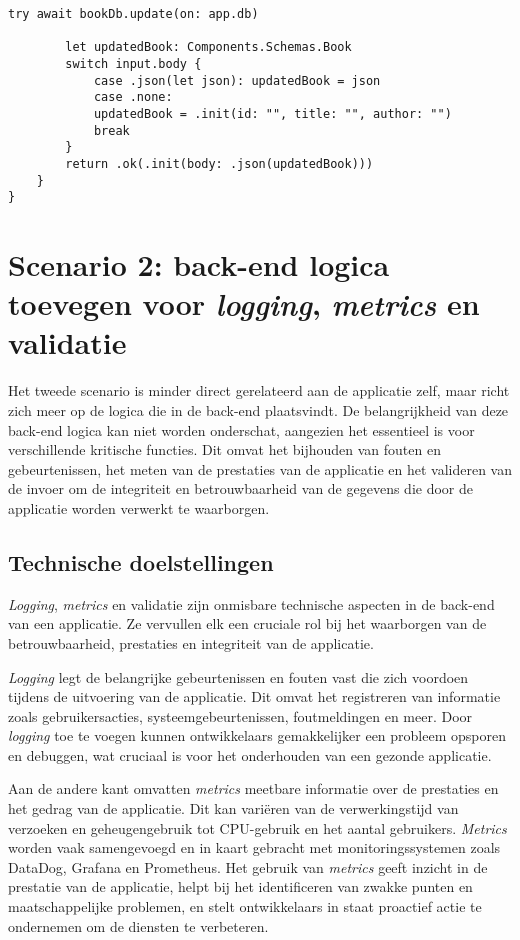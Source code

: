 \begin{lstlisting}[caption=handler file]
        try await bookDb.update(on: app.db)
        
        let updatedBook: Components.Schemas.Book
        switch input.body {
            case .json(let json): updatedBook = json
            case .none:
            updatedBook = .init(id: "", title: "", author: "")
            break
        }
        return .ok(.init(body: .json(updatedBook)))
    }
}

\end{lstlisting}

\section{Scenario 2: back-end logica toevegen voor \textit{logging}, \textit{metrics} en validatie}

Het tweede scenario is minder direct gerelateerd aan de applicatie zelf, maar richt zich meer op de logica die in de back-end plaatsvindt. De belangrijkheid van deze back-end logica kan niet worden onderschat, aangezien het essentieel is voor verschillende kritische functies. Dit omvat het bijhouden van fouten en gebeurtenissen, het meten van de prestaties van de applicatie en het valideren van de invoer om de integriteit en betrouwbaarheid van de gegevens die door de applicatie worden verwerkt te waarborgen.

\subsection{Technische doelstellingen}

\textit{Logging}, \textit{metrics} en validatie zijn onmisbare technische aspecten in de back-end van een applicatie. Ze vervullen elk een cruciale rol bij het waarborgen van de betrouwbaarheid, prestaties en integriteit van de applicatie.

\textit{Logging} legt de belangrijke gebeurtenissen en fouten vast die zich voordoen tijdens de uitvoering van de applicatie. Dit omvat het registreren van informatie zoals gebruikersacties, systeemgebeurtenissen, foutmeldingen en meer. Door \textit{logging} toe te voegen kunnen ontwikkelaars gemakkelijker een probleem opsporen en debuggen, wat cruciaal is voor het onderhouden van een gezonde applicatie. 

Aan de andere kant omvatten \textit{metrics} meetbare informatie over de prestaties en het gedrag van de applicatie. Dit kan variëren van de verwerkingstijd van verzoeken en geheugengebruik tot CPU-gebruik en het aantal gebruikers. \textit{Metrics} worden vaak samengevoegd en in kaart gebracht met monitoringssystemen zoals DataDog, Grafana en Prometheus. Het gebruik van \textit{metrics} geeft inzicht in de prestatie van de applicatie, helpt bij het identificeren van zwakke punten en maatschappelijke problemen, en stelt ontwikkelaars in staat proactief actie te ondernemen om de diensten te verbeteren. 

